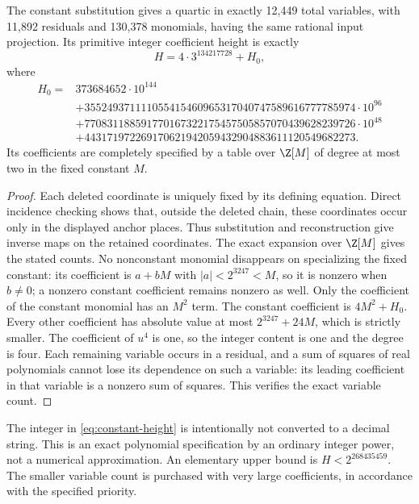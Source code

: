 \begin{proposition}\label{prop:constant-quartic}
The constant substitution gives a quartic in exactly 12,449 total
variables, with 11,892 residuals and 130,378 monomials, having the
same rational input projection. Its primitive integer coefficient
height is exactly
\begin{equation}\label{eq:constant-height}
 H=4\cdot3^{134217728}+H_0,
\end{equation}
where
\begin{align*}
H_0={}&373684652\cdot10^{144}\\
&+ 355249371111055415460965317040747589616777785974\cdot10^{96}\\
&+ 770831188591770167322175457505857070439628239726\cdot10^{48}\\
&+ 443171972269170621942059432904883611120549682273.
\end{align*}
Its coefficients are completely specified by a table over $\Z[M]$
of degree at most two in the fixed constant $M$.
\end{proposition}
\begin{proof}
Each deleted coordinate is uniquely fixed by its defining equation.
Direct incidence checking shows that, outside the deleted chain, these
coordinates occur only in the displayed anchor places. Thus substitution
and reconstruction give inverse maps on the retained coordinates.
The exact expansion over $\Z[M]$ gives the stated counts.
No nonconstant monomial disappears on specializing the fixed constant:
its coefficient is $a+bM$ with $|a|<2^{3247}<M$, so it is nonzero
when $b\ne0$; a nonzero constant coefficient remains nonzero as well.
Only the coefficient of the constant monomial has an $M^2$ term.
The constant coefficient is $4M^2+H_0$. Every other coefficient has
absolute value at most $2^{3247}+24M$, which is strictly smaller.
The coefficient of $u^4$ is one, so the integer content is one and the
degree is four. Each remaining variable occurs in a residual, and a
sum of squares of real polynomials cannot lose its dependence on such
a variable: its leading coefficient in that variable is a nonzero
sum of squares. This verifies the exact variable count.
\end{proof}

The integer in \eqref{eq:constant-height} is intentionally not converted
to a decimal string. This is an exact polynomial specification by an
ordinary integer power, not a numerical approximation. An elementary
upper bound is $H<2^{268435459}$. The smaller variable count is purchased
with very large coefficients, in accordance with the specified priority.

